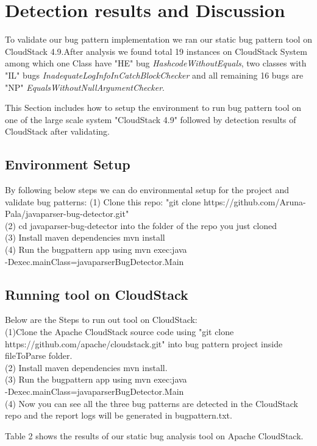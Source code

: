 \documentclass[sigplan,screen]{acmart}
\begin{document}
\section{Detection results and Discussion}
To validate our bug pattern implementation we ran our static bug pattern tool on CloudStack 4.9.After analysis we found total 19 instances on CloudStack System among which one Class have "HE" bug \emph{HashcodeWithoutEquals}, two classes with "IL" bugs \emph{InadequateLogInfoInCatchBlockChecker} and all remaining 16 bugs are "NP" \emph{EqualsWithoutNullArgumentChecker}. 

This Section includes how to setup the environment to run bug pattern tool on one of the large scale system "CloudStack 4.9" followed by detection results of CloudStack after validating.
\subsection{Environment Setup}
By following below steps we can do environmental setup for the project and validate bug patterns:
(1) Clone this repo: "git clone https://github.com/Aruna-Pala/javaparser-bug-detector.git"\\
(2) cd javaparser-bug-detector into the folder of the repo you just cloned\\
(3) Install maven dependencies mvn install\\
(4) Run the bugpattern app using mvn exec:java\\ -Dexec.mainClass=javaparserBugDetector.Main

\subsection{Running tool on CloudStack}

Below are the Steps to run out tool on CloudStack:\\
(1)Clone the Apache CloudStack source code using "git clone https://github.com/apache/cloudstack.git" into bug pattern project inside fileToParse folder.\\
(2) Install maven dependencies mvn install.\\
(3) Run the bugpattern app using mvn exec:java\\ -Dexec.mainClass=javaparserBugDetector.Main\\
(4) Now you can see all the three bug patterns are detected in the CloudStack repo and the report logs will be generated in bugpattern.txt.

Table 2 shows the results of our static bug analysis tool on Apache CloudStack. 
\end{document}
